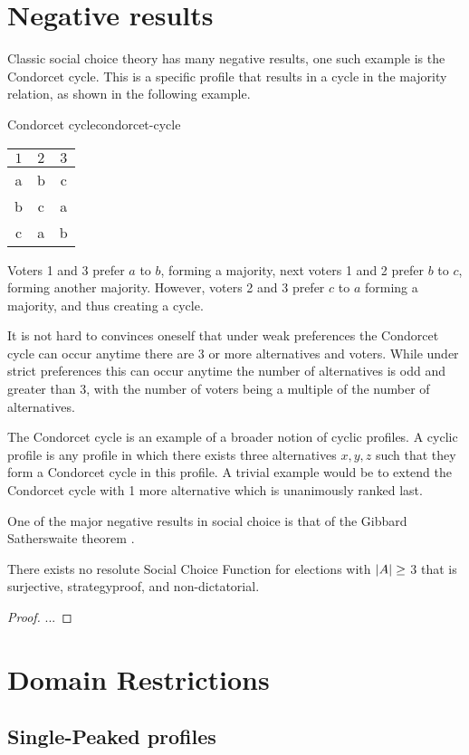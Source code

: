 \section{Negative results}
Classic social choice theory has many negative results, one such example is the Condorcet cycle. This is a specific profile that results in a cycle in the majority relation, as shown in the following example.

\begin{example}{Condorcet cycle}{condorcet-cycle}
	\begin{minipage}{0.15\linewidth}
		\begin{tabular}{ccc}
			\toprule
			$1$ & $2$ & $3$ \\
			\midrule
			a   & b   & c   \\
			b   & c   & a   \\
			c   & a   & b   \\
			\bottomrule
		\end{tabular}
	\end{minipage}
	\hspace{0.02\linewidth}
	\begin{minipage}{0.78\linewidth}
		Voters 1 and 3  prefer $a$ to $b$, forming a majority, next voters 1 and 2 prefer $b$ to $c$, forming another majority. However, voters 2 and 3 prefer $c$ to $a$ forming a majority, and thus creating a cycle.
	\end{minipage}
\end{example}

It is not hard to convinces oneself that under weak preferences the Condorcet cycle can occur anytime there are 3 or more alternatives and voters. While under strict preferences this can occur anytime the number of alternatives is odd and greater than 3, with the number of voters being a multiple of the number of alternatives.

The Condorcet cycle is an example of a broader notion of cyclic profiles. A cyclic profile is any profile in which there exists three alternatives $x,y,z$ such that they form a Condorcet cycle in this profile. A trivial example would be to extend the Condorcet cycle with 1 more alternative which is unanimously ranked last.

One of the major negative results in social choice is that of the Gibbard Satherswaite theorem \citep{gibbardManipulationVotingSchemes1973,satterthwaiteStrategyproofnessArrowsConditions1975}.

\begin{theorem}
	There exists no resolute Social Choice Function for elections with $|A| \geq$ 3 that is surjective, strategyproof, and non-dictatorial.
\end{theorem}

\begin{proof}
	...
\end{proof}

\section{Domain Restrictions}
\label{sec: Domain-res}

\subsection{Single-Peaked profiles}
\label{sec: Single-peaked}




